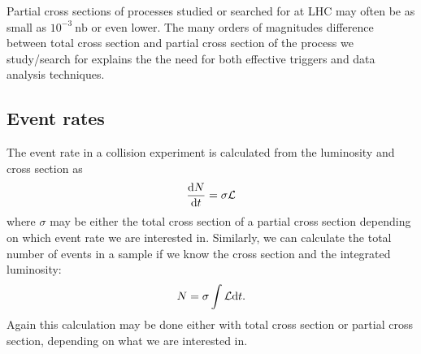 Partial cross sections of processes studied or searched for at LHC may often be as small as $10^{-3}~\mathrm{nb}$ or even lower. The many orders of magnitudes difference between total cross section and partial cross section of the process we study/search for explains the the need for both effective triggers and data analysis techniques.

\subsection{Event rates}
The event rate in a collision experiment is calculated from the luminosity and cross section as
\begin{displaymath}
	\frac{\text{d} N}{\text{d} t} = \sigma {\cal L}
\end{displaymath}
where $\sigma$ may be either the total cross section of a partial cross section depending on which event rate we are interested in. Similarly, we can calculate the total number of events in a sample if we know the cross section and the integrated luminosity:
\begin{displaymath}
	N = \sigma\int{\cal L}\text{d} t.
\end{displaymath}
Again this calculation may be done either with total cross section or partial cross section, depending on what we are interested in.